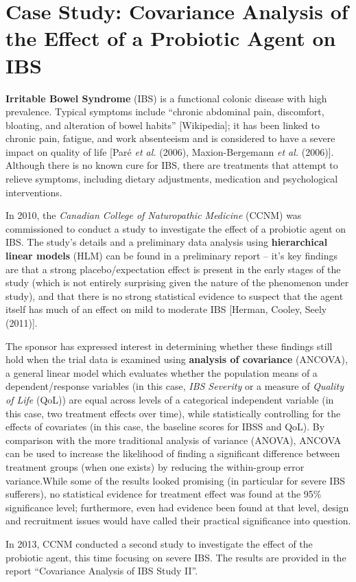 \section[Case Study: ANCOVA for a Clinical Study]{Case Study: Covariance Analysis of the Effect of a Probiotic Agent on IBS}\label{sec:CCNM}
\textbf{Irritable Bowel Syndrome} (IBS) is a functional colonic disease with high prevalence. Typical symptoms include ``chronic abdominal pain, discomfort, bloating, and alteration of bowel habits'' [Wikipedia]; it has been linked to chronic pain, fatigue, and work absenteeism and is considered to have a severe impact on quality of life [Par\'e \textit{et al.} (2006), Maxion-Bergemann \textit{et al.} (2006)]. Although there is no known cure for IBS, there are treatments that attempt to relieve symptoms, including dietary adjustments, medication and psychological interventions.
\par In 2010, the \textit{Canadian College of Naturopathic Medicine} (CCNM) was commissioned to conduct a study to investigate the effect of a probiotic agent on IBS. The study's details and a preliminary data analysis using \textbf{hierarchical linear models} (HLM) can be found in a preliminary report -- it's key findings are that a strong placebo/expectation effect is present in the early stages of the study (which is not entirely surprising given the nature of the phenomenon under study), and that there is no strong statistical evidence to suspect that the agent itself has much of an effect on mild to moderate IBS [Herman, Cooley, Seely (2011)].
\par The sponsor has expressed interest in determining whether these findings still hold when the trial data is examined using \textbf{analysis of covariance} (ANCOVA), a general linear model which evaluates whether the population means of a dependent/response variables (in this case, \textit{IBS Severity} or a measure of \textit{Quality of Life} (QoL)) are equal across levels of a categorical independent variable (in this case, two treatment effects over time), while statistically controlling for the effects of covariates (in this case, the baseline scores for IBSS and QoL). By comparison with the more traditional analysis of variance (ANOVA), ANCOVA can be used to increase the likelihood of finding a significant difference between treatment groups (when one exists) by reducing the within-group error variance.\newl While some of the results looked promising (in particular for severe IBS sufferers), no statistical evidence for treatment effect was found at the 95\% significance level; furthermore, even had evidence been found at that level, design and recruitment issues would have called their practical significance into question. \par In 2013, CCNM conducted a second study to investigate the effect of the probiotic agent, this time focusing on severe IBS. The results are provided in the report ``Covariance Analysis of IBS Study II''. 